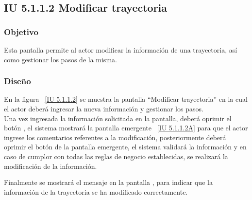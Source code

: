 \newpage 
\subsection{IU 5.1.1.2 Modificar trayectoria}

\subsubsection{Objetivo}
	
	Esta pantalla permite al actor modificar la información de una trayectoria, así como gestionar los pasos de la misma.

\subsubsection{Diseño}

    En la figura ~\ref{IU 5.1.1.2} se muestra la pantalla ``Modificar trayectoria'' en la cual el actor deberá ingresar la nueva información y gestionar los pasos.\\
      
    Una vez ingresada la información solicitada en la pantalla, deberá oprimir el botón , el sistema mostrará la pantalla emergente ~\ref{IU 5.1.1.2A} para que el actor ingrese los comentarios referentes a la modificación, posteriormente deberá oprimir el botón  de la pantalla emergente, el sistema validará la información y en caso de cumplor con todas las reglas de negocio establecidas, se realizará la modificación de la información.
	    
    Finalmente se mostrará el mensaje  en la pantalla , para indicar que la información de la trayectoria se ha modificado correctamente.        





